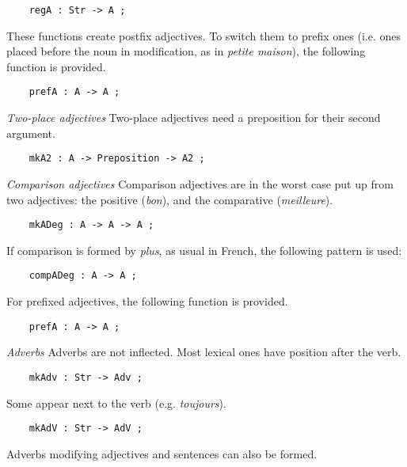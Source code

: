 \documentclass[11pt,a4paper]{article}
\newcommand{\subsubsubsection}[1]{\textit{#1}}
\begin{document}
\begin{verbatim}
    regA : Str -> A ;
\end{verbatim}

These functions create postfix adjectives. To switch
them to prefix ones (i.e. ones placed before the noun in
modification, as in \textit{petite maison}), the following function is
provided.

\begin{verbatim}
    prefA : A -> A ;
\end{verbatim}

\subsubsubsection{Two-place adjectives}
Two-place adjectives need a preposition for their second argument.

\begin{verbatim}
    mkA2 : A -> Preposition -> A2 ;
\end{verbatim}

\subsubsubsection{Comparison adjectives}
Comparison adjectives are in the worst case put up from two
adjectives: the positive (\textit{bon}), and the comparative (\textit{meilleure}). 

\begin{verbatim}
    mkADeg : A -> A -> A ;
\end{verbatim}

If comparison is formed by \textit{plus}, as usual in French,
the following pattern is used:

\begin{verbatim}
    compADeg : A -> A ;
\end{verbatim}

For prefixed adjectives, the following function is
provided.

\begin{verbatim}
    prefA : A -> A ;
\end{verbatim}

\subsubsubsection{Adverbs}
Adverbs are not inflected. Most lexical ones have position
after the verb. 

\begin{verbatim}
    mkAdv : Str -> Adv ;
\end{verbatim}

Some appear next to the verb (e.g. \textit{toujours}).

\begin{verbatim}
    mkAdV : Str -> AdV ;
\end{verbatim}

Adverbs modifying adjectives and sentences can also be formed.
\end{document}
